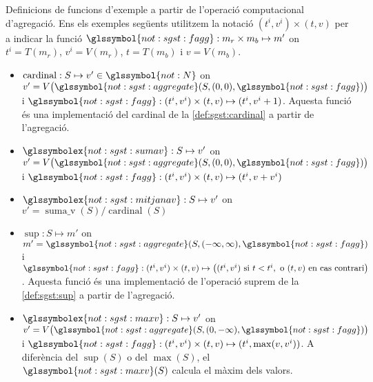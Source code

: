 \begin{example}
  Definicions de funcions d'exemple a partir de l'operació
  computacional d'agregació. Ens els exemples següents utilitzem la
  notació $(t^i,v^i) \times(t,v)$ per a indicar la funció
  $\glssymbol{not:sgst:fagg}: m_r \times m_b \mapsto m'$ on $t^i
  = T(m_r)$, $v^i=V(m_r)$, $t=T(m_b)$ i $v=V(m_b)$.


\begin{itemize}
\item $\operatorname{cardinal}: S \mapsto v'\in \glssymbol{not:N}$ on
  $v'=V\big( \glssymbol{not:sgst:aggregate}
  (S,(0,0),\glssymbol{not:sgst:fagg}) \big)$ i
  $\glssymbol{not:sgst:fagg}: (t^i,v^i) \times(t,v) \mapsto
  (t^i,v^i+1) $. Aquesta funció és una implementació del cardinal de
  la \autoref{def:sgst:cardinal} a partir de l'agregació.


\item $\glssymbolex{not:sgst:sumav}: S \mapsto v'$ on $v'=V\big(
  \glssymbol{not:sgst:aggregate} (S,(0,0),\glssymbol{not:sgst:fagg} )
  \big)$ i $\glssymbol{not:sgst:fagg}: (t^i,v^i) \times (t,v)
  \mapsto(t^i,v+v^i)$ \label{def:sgst:sumav}

\item $\glssymbolex{not:sgst:mitjanav}: S \mapsto v'$ on $v'=
  \operatorname{suma\_v}(S) / \operatorname{cardinal}(S)$ \label{def:sgst:mitjanav}

\item $\operatorname{sup}: S \mapsto m'$ on $m'=
  \glssymbol{not:sgst:aggregate}(S,(-\infty,\infty),\glssymbol{not:sgst:fagg}
  )$ i $\glssymbol{not:sgst:fagg}: (t^i,v^i)\times(t,v) \mapsto \big(
  (t^i,v^i) \text{ si } t < t^i, \text{ o } (t,v) \text{ en cas
    contrari}\big) $. Aquesta funció és una implementació de
  l'operació suprem de la \autoref{def:sgst:sup} a partir de
  l'agregació.

\item $\glssymbolex{not:sgst:maxv}: S \mapsto v'$ on $v'= V\big(
  \glssymbol{not:sgst:aggregate}
  (S,(0,-\infty),\glssymbol{not:sgst:fagg} ) \big)$ i
  $\glssymbol{not:sgst:fagg}: (t^i,v^i) \times (t,v)
  \mapsto(t^i,\max(v,v^i))$. A diferència del $\sup(S)$ o del
  $\max(S)$, el $\glssymbol{not:sgst:maxv}(S)$ calcula el màxim dels
  valors.   \label{def:sgst:maxv}



\end{itemize}
\end{example}

